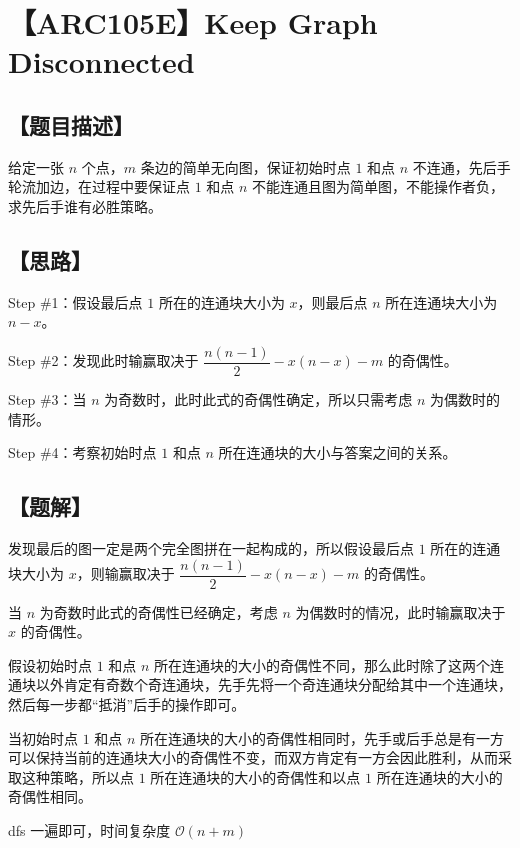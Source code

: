 \documentclass[UTF8,12pt,a4paper]{ctexart} %
\newcommand{\stress}[1]{\textbf{\CJKunderdot{#1}}}
\begin{document}
	\fontsize{12pt}{12pt}\selectfont
	
	\newpage
	\pagestyle{fancy}
	
	\section*{【ARC105E】Keep Graph Disconnected}
	
	\subsection*{【题目描述】}
	
	给定一张 $n$ 个点，$m$ 条边的简单无向图，保证初始时点 $1$ 和点 $n$ 不连通，先后手轮流加边，在过程中要保证点 $1$ 和点 $n$ 不能连通且图为简单图，不能操作者负，求先后手谁有必胜策略。
	
	\subsection*{【思路】}
	
	Step \#1：假设最后点 $1$ 所在的连通块大小为 $x$，则最后点 $n$ 所在连通块大小为 $n-x$。
	
	Step \#2：发现此时输赢取决于 $\dfrac{n(n-1)}{2}-x(n-x)-m$ 的奇偶性。
	
	Step \#3：当 $n$ 为奇数时，此时此式的奇偶性确定，所以只需考虑 $n$ 为偶数时的情形。
	
	Step \#4：考察初始时点 $1$ 和点 $n$ 所在连通块的大小与答案之间的关系。
	
	\subsection*{【题解】}
	
	发现最后的图一定是两个完全图拼在一起构成的，所以假设最后点 $1$ 所在的连通块大小为 $x$，则输赢取决于 $\dfrac{n(n-1)}{2}-x(n-x)-m$ 的奇偶性。
	
	当 $n$ 为奇数时此式的奇偶性已经确定，考虑 $n$ 为偶数时的情况，此时输赢取决于 $x$ 的奇偶性。
	
	假设初始时点 $1$ 和点 $n$ 所在连通块的大小的奇偶性不同，那么此时除了这两个连通块以外肯定有奇数个奇连通块，先手先将一个奇连通块分配给其中一个连通块，然后每一步都“抵消”后手的操作即可。
	
	当初始时点 $1$ 和点 $n$ 所在连通块的大小的奇偶性相同时，先手或后手总是有一方可以保持当前的连通块大小的奇偶性不变，而双方肯定有一方会因此胜利，从而采取这种策略，所以\stress{最终}点 $1$ 所在连通块的大小的奇偶性和以\stress{初始时}点 $1$ 所在连通块的大小的奇偶性相同。
	
	dfs 一遍即可，时间复杂度 $\mathcal{O}(n+m)$
	
\end{document}
